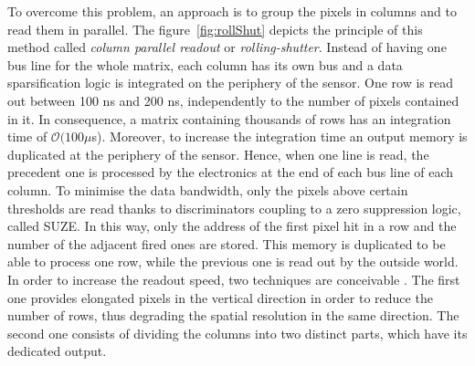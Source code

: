    To overcome this problem, an approach is to group the pixels in columns and to read them in parallel.
    The figure~\ref{fig:rollShut} depicts the principle of this method called \textit{column parallel readout} or \textit{rolling-shutter}.
    Instead of having one bus line for the whole matrix, each column has its own bus and a data sparsification logic is integrated on the periphery of the sensor.
    One row is read out between 100 ns and 200 ns, independently to the number of pixels contained in it.
    In consequence, a matrix containing thousands of rows has an integration time of $\mathcal{O}(100\mu$s).
    Moreover, to increase the integration time an output memory is duplicated at the periphery of the sensor.
    Hence, when one line is read, the precedent one is processed by the electronics at the end of each bus line of each column.
    To minimise the data bandwidth, only the pixels above certain thresholds are read thanks to discriminators coupling to a zero suppression logic, called \gls{SUZE}.
    In this way, only the address of the first pixel hit in a row and the number of the adjacent fired ones are stored.
    This memory is duplicated to be able to process one row, while the previous one is read out by the outside world.
    In order to increase the readout speed, two techniques are conceivable \cite{Winter:2009zz}.
    The first one provides elongated pixels in the vertical direction in order to reduce the number of rows, thus degrading the spatial resolution in the same direction.
    The second one consists of dividing the columns into two distinct parts, which have its dedicated output.


